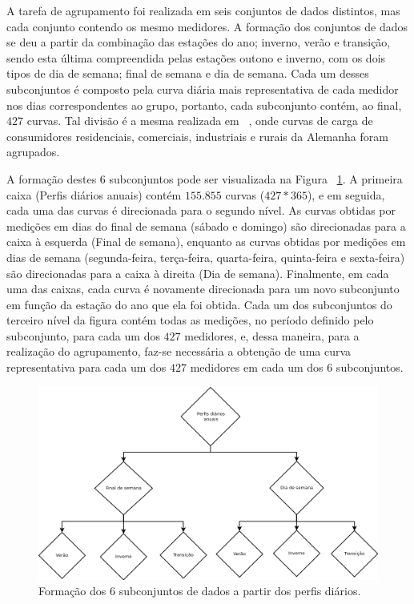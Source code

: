 A tarefa de agrupamento foi realizada em seis conjuntos de dados distintos, mas cada conjunto contendo os mesmo medidores. A formação dos conjuntos de dados se deu a partir da combinação das estações do ano; inverno, verão e transição, sendo esta última compreendida pelas estações outono e inverno, com os dois tipos de dia de semana; final de semana e dia de semana. Cada um desses subconjuntos é composto pela curva diária mais representativa de cada medidor nos dias correspondentes ao grupo, portanto, cada subconjunto contém, ao final, $427$ curvas. Tal divisão é a mesma realizada em ~\parencite{Flath2012}, onde curvas de carga de consumidores residenciais, comerciais, industriais e rurais da Alemanha foram agrupados.

A formação destes $6$ subconjuntos pode ser visualizada na Figura ~\ref{fig:diagrama_dados}. A primeira caixa (Perfis diários anuais) contém $155.855$ curvas ($427*365$), e em seguida, cada uma das curvas é direcionada para o segundo nível. As curvas obtidas por medições em dias do final de semana (sábado e domingo) são direcionadas para a caixa à esquerda (Final de semana), enquanto as curvas obtidas por medições em dias de semana (segunda-feira, terça-feira, quarta-feira, quinta-feira e sexta-feira) são direcionadas para a caixa à direita (Dia de semana). Finalmente, em cada uma das caixas, cada curva é novamente direcionada para um novo subconjunto em função da estação do ano que ela foi obtida. Cada um dos subconjuntos do terceiro nível da figura contém todas as medições, no período definido pelo subconjunto, para cada um dos $427$ medidores, e, dessa maneira, para a realização do agrupamento, faz-se necessária a obtenção de uma curva representativa para cada um dos $427$ medidores em cada um dos $6$ subconjuntos.

 \begin{figure}[!h]
	\includegraphics[width=\linewidth]{figuras/diagrama_dados.png}
	\caption{Formação dos $6$ subconjuntos de dados a partir dos perfis diários.}
	\label{fig:diagrama_dados}
\end{figure}

